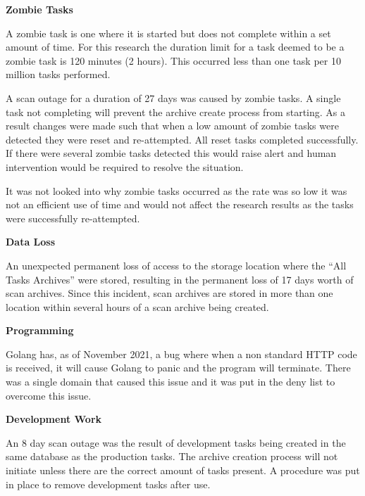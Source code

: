 \documentclass{mscreport}
\begin{document}
\textbf{Zombie Tasks}

\vspace{0.2cm} \noindent
A zombie task is one where it is started but does not complete within a set amount of time. For this research the duration limit for a task deemed to be a zombie task is 120 minutes (2 hours). This occurred less than one task per 10 million tasks performed.

\vspace{0.2cm} \noindent
A scan outage for a duration of 27 days was caused by zombie tasks. A single task not completing will prevent the archive create process from starting. As a result changes were made such that when a low amount of zombie tasks were detected they were reset and re-attempted. All reset tasks completed successfully. If there were several zombie tasks detected this would raise alert and human intervention would be required to resolve the situation.

\vspace{0.2cm} \noindent
It was not looked into why zombie tasks occurred as the rate was so low it was not an efficient use of time and would not affect the research results as the tasks were successfully re-attempted.

\vspace{0.6cm} \noindent
\textbf{Data Loss}

\vspace{0.2cm} \noindent
An unexpected permanent loss of access to the storage location where the ``All Tasks Archives'' were stored, resulting in the permanent loss of 17 days worth of scan archives. Since this incident, scan archives are stored in more than one location within several hours of a scan archive being created.

\vspace{0.6cm} \noindent
\textbf{Programming}

\vspace{0.2cm} \noindent
Golang has, as of November 2021, a bug \cite{noauthor_undated-kp} where when a non standard HTTP code is received, it will cause Golang to panic and the program will terminate. There was a single domain that caused this issue and it was put in the deny list to overcome this issue.

\vspace{0.6cm} \noindent
\textbf{Development Work}

\vspace{0.2cm} \noindent
An 8 day scan outage was the result of development tasks being created in the same database as the production tasks. The archive creation process will not initiate unless there are the correct amount of tasks present. A procedure was put in place to remove development tasks after use.
\end{document}
